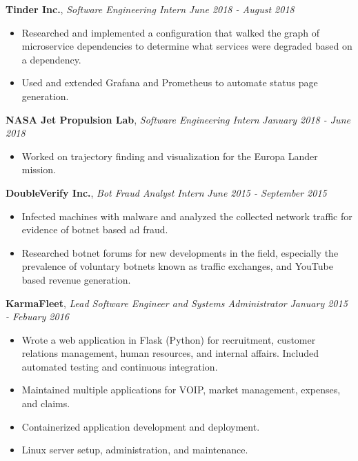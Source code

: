 \documentclass[9pt]{article}
\newenvironment{changemargin}[2]{%
  \begin{list}{}{%
    \setlength{\topsep}{0pt}%
    \setlength{\leftmargin}{#1}%
    \setlength{\rightmargin}{#2}%
    \setlength{\listparindent}{\parindent}%
    \setlength{\itemindent}{\parindent}%
    \setlength{\parsep}{\parskip}%
  }%
  \item[]}{\end{list}
}
\newenvironment{body} {
	\vspace*{-16pt}
	\begin{changemargin}{-0.25in}{-0.5in}
  }	
	{\end{changemargin}
}
\begin{document}
\begin{body}
	\textbf{Tinder Inc.}, \emph{Software Engineering Intern} \hfill \emph{June 2018 - August 2018}\\
	\vspace*{-3pt}
	\begin{itemize} \itemsep -0pt %
		\item Researched and implemented a configuration that walked the graph of
		microservice dependencies to determine what services were degraded based on a dependency.
		\item Used and extended Grafana and Prometheus to automate status page generation.
	\end{itemize}
	\vspace*{-2pt}


	\textbf{NASA Jet Propulsion Lab}, \emph{Software Engineering Intern} \hfill \emph{January 2018 - June 2018}\\
	\vspace*{-3pt}
	\begin{itemize} \itemsep -0pt %
		\item Worked on trajectory finding and visualization for the Europa Lander mission.
	\end{itemize}
	\vspace*{-2pt}

	\textbf{DoubleVerify Inc.}, \emph{Bot Fraud Analyst Intern} \hfill \emph{June 2015 - September 2015}\\
	\vspace*{-3pt}
	\begin{itemize} \itemsep -0pt %
		\item Infected machines with malware and analyzed the collected network traffic for evidence of botnet based ad fraud.
		\item Researched botnet forums for new developments in the field, especially the prevalence of voluntary botnets known as traffic exchanges, and YouTube based revenue generation.
	\end{itemize}
	\vspace*{-2pt}

	\textbf{KarmaFleet}, \emph{Lead Software Engineer and Systems Administrator} \hfill \emph{January 2015 - Febuary 2016}\\
	\vspace*{-3pt}
	\begin{itemize} \itemsep -0pt %
		\item Wrote a web application in Flask (Python) for recruitment, customer relations management, human resources, and internal affairs. Included automated testing and continuous integration.
		\item Maintained multiple applications for VOIP, market management, expenses, and claims.
		\item Containerized application development and deployment.
		\item Linux server setup, administration, and maintenance.
	\end{itemize}
	\vspace*{-2pt}


\end{body}
\end{document}
